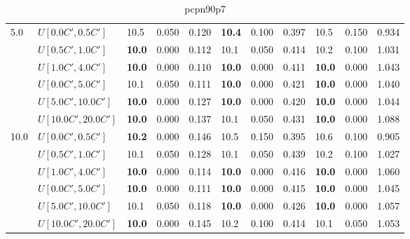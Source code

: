 \begin{table}[h]
{\begin{tabular}{|l|l||l|l|l||l|l|l||l|l|l|}
      \hline\hline
      \multirow{6}{*}{5.0} & $U[0.0C',0.5C']$ & 10.5 & 0.050 & 0.120 & \textbf{10.4} & 0.100 & 0.397 & 10.5 & 0.150 & 0.934 \\
       & $U[0.5C',1.0C']$ & \textbf{10.0} & 0.000 & 0.112 & 10.1 & 0.050 & 0.414 & 10.2 & 0.100 & 1.031 \\
       & $U[1.0C',4.0C']$ & \textbf{10.0} & 0.000 & 0.110 & \textbf{10.0} & 0.000 & 0.411 & \textbf{10.0} & 0.000 & 1.043 \\
       & $U[0.0C',5.0C']$ & 10.1 & 0.050 & 0.111 & \textbf{10.0} & 0.000 & 0.421 & \textbf{10.0} & 0.000 & 1.040 \\
       & $U[5.0C',10.0C']$ & \textbf{10.0} & 0.000 & 0.127 & \textbf{10.0} & 0.000 & 0.420 & \textbf{10.0} & 0.000 & 1.044 \\
       & $U[10.0C',20.0C']$ & \textbf{10.0} & 0.000 & 0.137 & 10.1 & 0.050 & 0.431 & \textbf{10.0} & 0.000 & 1.088 \\
      \hline\hline
      \multirow{6}{*}{10.0} & $U[0.0C',0.5C']$ & \textbf{10.2} & 0.000 & 0.146 & 10.5 & 0.150 & 0.395 & 10.6 & 0.100 & 0.905 \\
       & $U[0.5C',1.0C']$ & 10.1 & 0.050 & 0.128 & 10.1 & 0.050 & 0.439 & 10.2 & 0.100 & 1.027 \\
       & $U[1.0C',4.0C']$ & \textbf{10.0} & 0.000 & 0.114 & \textbf{10.0} & 0.000 & 0.416 & \textbf{10.0} & 0.000 & 1.060 \\
       & $U[0.0C',5.0C']$ & \textbf{10.0} & 0.000 & 0.111 & \textbf{10.0} & 0.000 & 0.415 & \textbf{10.0} & 0.000 & 1.045 \\
       & $U[5.0C',10.0C']$ & 10.1 & 0.050 & 0.118 & \textbf{10.0} & 0.000 & 0.426 & \textbf{10.0} & 0.000 & 1.057 \\
       & $U[10.0C',20.0C']$ & \textbf{10.0} & 0.000 & 0.145 & 10.2 & 0.100 & 0.414 & 10.1 & 0.050 & 1.053 \\
      \hline
      \end{tabular}
      }
      \caption{pcpn90p7}
      \label{tab:pcpn90p7RecoloredTT}
      \end{table}

